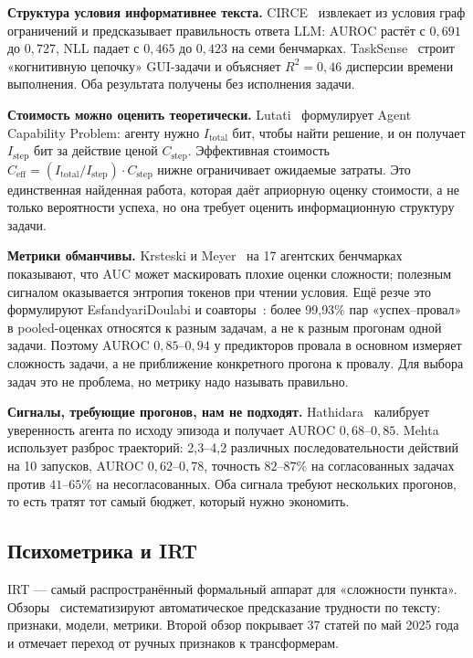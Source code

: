 \documentclass[11pt,a4paper]{article}
\begin{document}
\textbf{Структура условия информативнее текста.}
CIRCE~\cite{hong2026circe} извлекает из условия граф ограничений и предсказывает
правильность ответа LLM: AUROC растёт с $0{,}691$ до $0{,}727$, NLL падает с
$0{,}465$ до $0{,}423$ на семи бенчмарках. TaskSense~\cite{yin2025tasksense}
строит «когнитивную цепочку» GUI-задачи и объясняет $R^2 = 0{,}46$ дисперсии
времени выполнения. Оба результата получены без исполнения задачи.

\textbf{Стоимость можно оценить теоретически.}
Lutati~\cite{lutati2025capability} формулирует Agent Capability Problem:
агенту нужно $I_{\text{total}}$ бит, чтобы найти решение, и он получает
$I_{\text{step}}$ бит за действие ценой $C_{\text{step}}$. Эффективная
стоимость $C_{\text{eff}} = (I_{\text{total}}/I_{\text{step}}) \cdot
C_{\text{step}}$ нижне ограничивает ожидаемые затраты. Это единственная
найденная работа, которая даёт априорную оценку стоимости, а не только
вероятности успеха, но она требует оценить информационную структуру задачи.

\textbf{Метрики обманчивы.}
Krsteski и Meyer~\cite{krsteski2026difficulty} на 17 агентских бенчмарках
показывают, что AUC может маскировать плохие оценки сложности; полезным
сигналом оказывается энтропия токенов при чтении условия. Ещё резче это
формулируют EsfandyariDoulabi и соавторы~\cite{esfandiaridoulabi2026disentangling}:
более 99{,}93\% пар «успех--провал» в pooled-оценках относятся к разным
задачам, а не к разным прогонам одной задачи. Поэтому AUROC $0{,}85$--$0{,}94$
у предикторов провала в основном измеряет сложность задачи, а не приближение
конкретного прогона к провалу. Для выбора задач это не проблема, но метрику
надо называть правильно.

\textbf{Сигналы, требующие прогонов, нам не подходят.}
Hathidara~\cite{hathidara2026failure} калибрует уверенность агента по исходу
эпизода и получает AUROC $0{,}68$--$0{,}85$. Mehta~\cite{mehta2026disagree}
использует разброс траекторий: 2{,}3--4{,}2 различных последовательности
действий на 10 запусков, AUROC $0{,}62$--$0{,}78$, точность $82$--$87\%$ на
согласованных задачах против $41$--$65\%$ на несогласованных. Оба сигнала
требуют нескольких прогонов, то есть тратят тот самый бюджет, который нужно
экономить.

\subsection{Психометрика и IRT}

IRT — самый распространённый формальный аппарат для «сложности пункта».
Обзоры~\cite{alkhuzaey2024text,peters2025textbased} систематизируют
автоматическое предсказание трудности по тексту: признаки, модели, метрики.
Второй обзор покрывает 37 статей по май 2025 года и отмечает переход от
ручных признаков к трансформерам.
\end{document}
